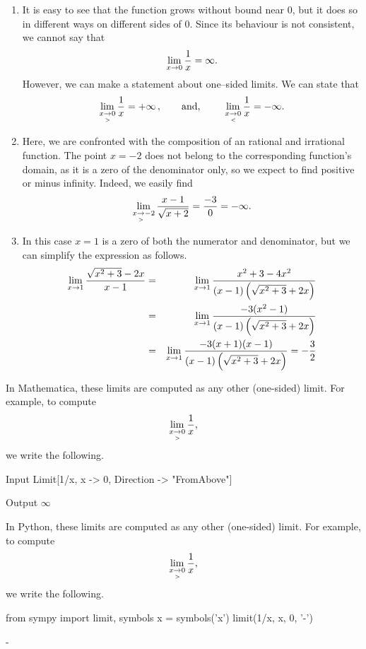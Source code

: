 \begin{example}
\begin{enumerate}
\item  It is easy to see that the function grows without bound near 0, but it does so in different ways on different sides of 0.  Since its behaviour is not consistent, we cannot say that 
$$\displaystyle \lim_{x\to 0}\frac{1}{x}=\infty.$$
 However, we can make a statement about one--sided limits. We can state that 
$$\displaystyle \lim_{x\underset{>}{\rightarrow}0}\frac1x=+\infty\,,\qquad \text{and, }\qquad \displaystyle \lim_{x\underset{<}{\rightarrow}0}\frac1x=-\infty.$$  
\item Here, we are confronted with the composition of an rational and irrational function. The point $x=-2$ does not belong to the corresponding function's domain, as it is a zero of the denominator only, so we expect to find positive or minus infinity. Indeed, we easily find
\[ \displaystyle\lim_{x\underset{>}{\rightarrow}-2}\dfrac{x-1}{\sqrt{x+2}}=\dfrac{-3}{0} = -\infty.\] 
\item In this case $x=1$ is a zero of both the numerator and denominator, but we can simplify the expression as follows.
\begin{eqnarray*}
\displaystyle\lim_{x\rightarrow 1}\dfrac{\sqrt{x^2+3}-2x}{x-1} &=&\displaystyle\lim_{x\rightarrow 1}\dfrac{x^2+3-4x^2}{(x-1)\left(\sqrt{x^2+3}+2x\right)} \\
&=&\displaystyle\lim_{x\rightarrow 1}\dfrac{-3(x^2-1)}{(x-1)\left(\sqrt{x^2+3}+2x\right)}\\
&=&\displaystyle\lim_{x\rightarrow 1}\dfrac{-3(x+1)(x-1)}{(x-1)\left(\sqrt{x^2+3}+2x\right)} = -\dfrac{3}{2}
\end{eqnarray*}
\end{enumerate}

\ifmathematica
\ifcourse
In Mathematica, these limits are computed as any other (one-sided) limit. For example, to compute 
$$\displaystyle \lim_{x\underset{>}{\rightarrow}0}\frac1x,$$
 we write the following.
\begin{mdframed}[default,backgroundcolor=gray!40,roundcorner=8pt]
\begin{mmaCell}[morefunctionlocal={x},moredefined={Direction}]{Input}
  Limit[1/x, x -> 0, Direction -> "FromAbove"]
\end{mmaCell}

\begin{mmaCell}{Output}
  \(\infty\)
\end{mmaCell}
\end{mdframed}
\fi
\fi

\ifpython
\ifcourse
In Python, these limits are computed as any other (one-sided) limit. For example, to compute 
$$\displaystyle \lim_{x\underset{>}{\rightarrow}0}\frac1x,$$
 we write the following.
\begin{pyin}
from sympy import limit, symbols
x = symbols('x')
limit(1/x, x, 0, '-')
\end{pyin}
\begin{pyout}
-\infty
\end{pyout}
\fi
\fi

\end{example}



